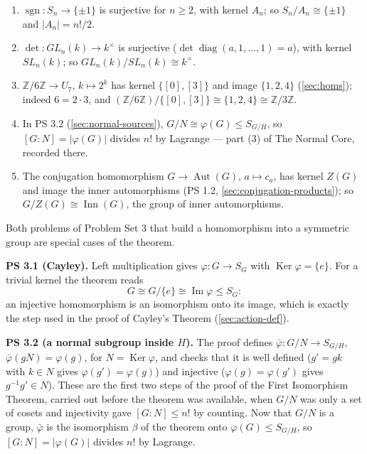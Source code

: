 \documentclass[11pt]{report}
\newcommand{\sgn}{\operatorname{sgn}}
\begin{document}
\begin{exbox}\label{ex:first-isomorphism-theorem-action}
\begin{enumerate}[nosep]
    \item $\sgn: S_n \to \{\pm 1\}$ is surjective for $n \geq 2$, with kernel $A_n$; so $S_n/A_n \cong \{\pm 1\}$ and $|A_n| = n!/2$.
    \item $\det: GL_n(k) \to k^\times$ is surjective ($\det \operatorname{diag}(a, 1, \ldots, 1) = a$), with kernel $SL_n(k)$; so $GL_n(k)/SL_n(k) \cong k^\times$.
    \item $\mathbb{Z}/6\mathbb{Z} \to U_7$, $k \mapsto 2^k$ has kernel $\{[0], [3]\}$ and image $\{1, 2, 4\}$ (\ref{sec:homs}); indeed $6 = 2 \cdot 3$, and $(\mathbb{Z}/6\mathbb{Z})/\{[0],[3]\} \cong \{1, 2, 4\} \cong \mathbb{Z}/3\mathbb{Z}$.
    \item In PS 3.2 (\ref{sec:normal-sources}), $G/N \cong \varphi(G) \leq S_{G/H}$, so $[G : N] = |\varphi(G)|$ divides $n!$ by Lagrange --- part (3) of The Normal Core, recorded there.
    \item The conjugation homomorphism $G \to \operatorname{Aut}(G)$, $a \mapsto c_a$, has kernel $Z(G)$ and image the inner automorphisms (PS 1.2, \ref{sec:conjugation-products}); so $G/Z(G) \cong \operatorname{Inn}(G)$, the group of inner automorphisms.
\end{enumerate}
\end{exbox}

\begin{rembox}\label{rem:ps-3-1-ps-3-2-instances}
Both problems of Problem Set 3 that build a homomorphism into a symmetric group are special cases of the theorem.

\textbf{PS 3.1 (Cayley).} Left multiplication gives $\varphi: G \to S_G$ with $\operatorname{Ker}\varphi = \{e\}$. For a trivial kernel the theorem reads
\[ G \cong G/\{e\} \cong \operatorname{Im}\varphi \leq S_G: \]
an injective homomorphism is an isomorphism onto its image, which is exactly the step used in the proof of Cayley's Theorem (\ref{sec:action-def}).

\textbf{PS 3.2 (a normal subgroup inside $H$).} The proof defines $\bar\varphi: G/N \to S_{G/H}$, $\bar\varphi(gN) = \varphi(g)$, for $N = \operatorname{Ker}\varphi$, and checks that it is well defined ($g' = gk$ with $k \in N$ gives $\varphi(g') = \varphi(g)$) and injective ($\varphi(g) = \varphi(g')$ gives $g^{-1}g' \in N$). These are the first two steps of the proof of the First Isomorphism Theorem, carried out before the theorem was available, when $G/N$ was only a set of cosets and injectivity gave $[G:N] \leq n!$ by counting. Now that $G/N$ is a group, $\bar\varphi$ is the isomorphism $\beta$ of the theorem onto $\varphi(G) \leq S_{G/H}$, so $[G:N] = |\varphi(G)|$ divides $n!$ by Lagrange.
\end{rembox}
\end{document}
